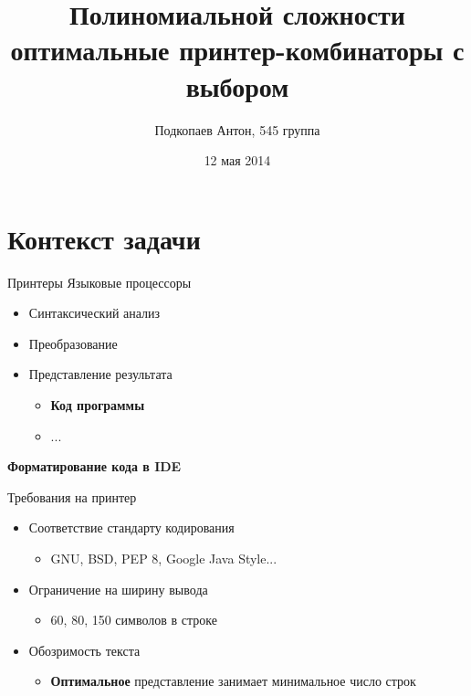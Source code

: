 \documentclass[sans]{beamer}
\begin{document}
\title
[PTOPPCC]
{Полиномиальной сложности оптимальные принтер-комбинаторы с выбором}
\author
[Подкопаев Антон]
{Подкопаев Антон, 545 группа}
\date [12-05-14]{12 мая 2014}

\begin{frame}[plain]
	\titlepage
\end{frame}

\section{Контекст задачи}

\begin{frame}{Принтеры}
	Языковые процессоры

	\begin{block}{}
		\begin{itemize}
			\item Синтаксический анализ
			\item Преобразование
			\item Представление результата
			\begin{itemize}
				\item \textbf{Код программы}
				\item ...
			\end{itemize}
		\end{itemize}
	\end{block}
  
  \textbf{Форматирование кода в IDE}

\end{frame}

\begin{frame}{Требования на принтер}
  \begin{itemize}
    \item Соответствие стандарту кодирования
      \begin{itemize}
        \item GNU, BSD, PEP 8, Google Java Style...
      \end{itemize}
      \vfill
    \item Ограничение на ширину вывода
      \begin{itemize}
        \item 60, 80, 150 символов в строке
      \end{itemize}
      \vfill
    \item Обозримость текста
      \begin{itemize}
        \item \textbf{Оптимальное} представление занимает
          минимальное число строк
      \end{itemize}
  \end{itemize}
\end{frame}
\end{document}
